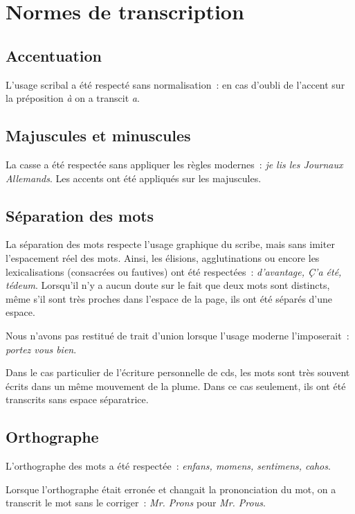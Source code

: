 \documentclass[a4paper,12pt,twoside]{book}
\begin{document}
	
	\chapter{Normes de transcription}
		\label{normes-trans}
	
		\section{Accentuation}
			L'usage scribal a été respecté sans normalisation~: en cas d'oubli de l'accent sur la préposition \textit{à} on a transcit \textit{a}.
		
		\section{Majuscules et minuscules}
			La casse a été respectée sans appliquer les règles modernes~: \textit{je lis les Journaux Allemands}. Les accents ont été appliqués sur les majuscules.
		
		\section{Séparation des mots}
			La séparation des mots respecte l'usage graphique du scribe, mais sans imiter l'espacement réel des mots. Ainsi, les élisions, agglutinations ou encore les lexicalisations (consacrées ou fautives) ont été respectées~: \textit{d'avantage, Ç'a été, tédeum}. Lorsqu'il n'y a aucun doute sur le fait que deux mots sont distincts, même s'il sont très proches dans l'espace de la page, ils ont été séparés d'une espace.
		
			Nous n'avons pas restitué de trait d'union lorsque l'usage moderne l'imposerait~: \textit{portez vous bien}.
	
			Dans le cas particulier de l'écriture personnelle de \gls{cds}, les mots sont très souvent écrits dans un même mouvement de la plume. Dans ce cas seulement, ils ont été transcrits sans espace séparatrice.
				
		\section{Orthographe}
			L'orthographe des mots a été respectée~: \textit{enfans, momens, sentimens, cahos}.
			
			Lorsque l'orthographe était erronée et changait la prononciation du mot, on a transcrit le mot sans le corriger~: \textit{Mr. Prons} pour \textit{Mr. Prous}.
		
\end{document}
